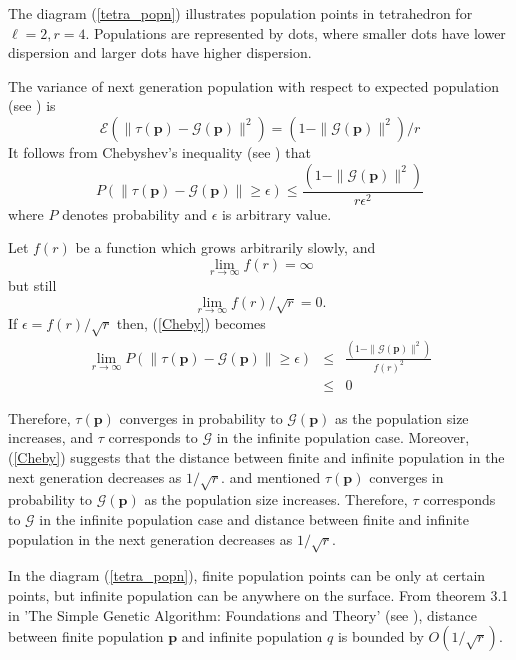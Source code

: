 The diagram (\ref{tetra_popn}) illustrates population points in tetrahedron for $\ell  =  2,  r  =  4$. Populations are represented by dots, 
where smaller dots have lower dispersion and larger dots have higher dispersion.

The variance of next generation population with respect to expected population (see \cite{Vose1999}) is 
\begin{equation}
\label{RHSvariance}
\mathcal{E}(\| \tau (\bm{p}) - \mathcal{G}(\bm{p}) \|^2) = (1 - \|\mathcal{G}(\bm{p})\|^2) / r
\end{equation}
It follows from Chebyshev's inequality (see \cite{ChebyshevInequality}) that 
\begin{equation}
\label{Cheby}
P(\| \tau (\bm{p}) - \mathcal{G}(\bm{p}) \| \geq \epsilon) \leq \frac{(1 - \|\mathcal{G}(\bm{p})\|^2)} {r{\epsilon}^2}
\end{equation}
where $P$ denotes probability and $\epsilon$ is arbitrary value.

Let $f(r)$ be a function which grows arbitrarily slowly, and 
\[
\lim_{r \to \infty} f(r)  =  \infty
\]
but still
\[
\lim_{r \to \infty} f(r)/\sqrt{r}  =  0.
\]
If $\epsilon  =  f(r)/\sqrt{r}$ then, (\ref{Cheby}) becomes
\begin{eqnarray*}
\lim_{r \to \infty} P(\| \tau (\bm{p}) - \mathcal{G}(\bm{p}) \| \geq \epsilon) & \leq & \frac{(1 - \|\mathcal{G}(\bm{p})\|^2)} {{f(r)}^2} \\
    & \leq & 0
\end{eqnarray*}

Therefore, $\tau(\bm{p})$ converges in probability to $\mathcal{G}(\bm{p})$ as the population size increases, 
and $\tau$ corresponds to $\mathcal{G}$ 
in the infinite population case. Moreover, (\ref{Cheby}) suggests that the distance between finite and 
infinite population in the next generation decreases as $1/\sqrt{r}$.
and mentioned $\tau (\bm{p})$ converges in probability to $\mathcal{G}(\bm{p})$ as the population size increases. 
Therefore, $\tau$ corresponds to $\mathcal{G}$ in the infinite
population case and distance between finite and infinite population in the next generation decreases as $1/\sqrt{r}$.

In the diagram (\ref{tetra_popn}), finite population points can be only at certain points, but infinite population can be anywhere on the surface. 
From theorem 3.1 in 'The Simple Genetic Algorithm: Foundations and Theory' (see \cite{Vose1999}), distance between finite population $\bm{p}$ 
and infinite population $q$ is bounded by $O(1/\sqrt{r})$. 

